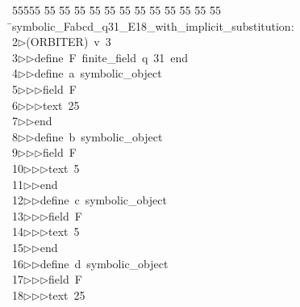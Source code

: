 %
%
\begin{tabbing}
55555 \= 55 \= 55 \= 55 \= 55 \= 55 \= 55 \= 55 \= 55 \= 55 \= 55 \= 55 \= 55 \= \>symbolic\_Fabcd\_q31\_E18\_with\_implicit\_substitution:\\[0pt]
2\>$\triangleright$\>(ORBITER)\ v\ 3\ \\[0pt]
3\>$\triangleright$\>$\triangleright$\>define\ F\ finite\_field\ q\ 31\ end\ \\[0pt]
4\>$\triangleright$\>$\triangleright$\>define\ a\ symbolic\_object\ \\[0pt]
5\>$\triangleright$\>$\triangleright$\>$\triangleright$\>field\ F\ \\[0pt]
6\>$\triangleright$\>$\triangleright$\>$\triangleright$\>text\ 25\ \\[0pt]
7\>$\triangleright$\>$\triangleright$\>end\ \\[0pt]
8\>$\triangleright$\>$\triangleright$\>define\ b\ symbolic\_object\ \\[0pt]
9\>$\triangleright$\>$\triangleright$\>$\triangleright$\>field\ F\ \\[0pt]
10\>$\triangleright$\>$\triangleright$\>$\triangleright$\>text\ 5\ \\[0pt]
11\>$\triangleright$\>$\triangleright$\>end\ \\[0pt]
12\>$\triangleright$\>$\triangleright$\>define\ c\ symbolic\_object\ \\[0pt]
13\>$\triangleright$\>$\triangleright$\>$\triangleright$\>field\ F\ \\[0pt]
14\>$\triangleright$\>$\triangleright$\>$\triangleright$\>text\ 5\ \\[0pt]
15\>$\triangleright$\>$\triangleright$\>end\ \\[0pt]
16\>$\triangleright$\>$\triangleright$\>define\ d\ symbolic\_object\ \\[0pt]
17\>$\triangleright$\>$\triangleright$\>$\triangleright$\>field\ F\ \\[0pt]
18\>$\triangleright$\>$\triangleright$\>$\triangleright$\>text\ 25\ \\[0pt]

\end{tabbing}
